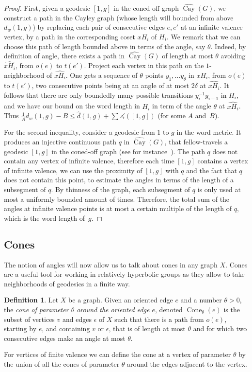 \documentclass[11pt]{article}
\theoremstyle{definition}
\newtheorem{defi}[theo]{Definition}
\numberwithin{equation}{section}
\DeclareMathOperator{\Co}{Cone}
\DeclareMathOperator{\Cay}{Cay}
\newcommand{\A}{\measuredangle}
\begin{document}
\begin{proof}
First, given a geodesic $[1,g]$ in the coned-off graph $\widehat{{\Cay}} (G)$, we construct a path in the Cayley graph (whose length will bounded from above $d_w(1,g)$) by replacing each pair of consecutive edges $e,e'$ at an infinite valence vertex, by a path in the corresponding coset $xH_i$ of $H_i$. We remark that we can choose this path of length bounded above in terms of the angle, say $\theta$. Indeed, by definition of angle, there exists a path in $\widehat{{\Cay}} (G)$ of length at most $\theta$ avoiding $\widehat{xH_i}$, from $o(e)$ to $t(e')$. Project each vertex in this path on the $1$-neighborhood of $\widehat{xH_i}$. One gets a sequence of $\theta$ points $y_1, \dots y_\theta$ in $xH_i$, from $o(e)$ to $t(e')$, two consecutive points being at an angle of at most $2\delta$ at $\widehat{xH_i}$. It follows that there are only boundedly many possible transitions $y_i^{-1}y_{i+1}$ in $H_i$, and we have our bound on the word length in $H_i$ in term of the angle $\theta$ at $\widehat{xH_i}$. Thus $ \frac1A d_w(1,g) -B \leq \hat{d}(1,g) + \sum\A ([1,g]) $ (for some $A$ and~$B$).

For the second inequality, consider a geodesic from $1$ to $g$ in the word metric. It produces an injective continuous path $q$ in $\widehat{{\Cay}} (G)$, that fellow-travels a geodesic $[1,g]$ in the coned-off graph (see for instance~\cite[Prop.~8.25]{DS}). The path $q$ does not contain any vertex of infinite valence, therefore each time $[1,g]$ contains a vertex of infinite valence, we can use the proximity of $[1,g]$ with $q$ and the fact that $q$ does not contain this point, to estimate the angles in terms of the length of a subsegment of $q$. By thinness of the graph, each subsegment of $q$ is only used at most a uniformly bounded amount of times. Therefore, the total sum of the angles at infinite valence points is at most a certain multiple of the length of $q$, which is the word length of~$g$.
\end{proof}

\subsection{Cones}
The notion of angles will now allow us to talk about cones in any graph $X$. Cones are a useful tool for working in relatively hyperbolic groups as they allow to take neighborhoods of geodesics in a finite way.

\begin{defi}
Let $X$ be a graph. Given an oriented edge $e$ and a number $\theta>0$, the \emph{cone of parameter $\theta$ around the oriented edge $e$}, denoted $\Co_{\theta}(e)$ is the subset of vertices $v$ and edges $\epsilon$ of $X$ such that there is a path from $o(e)$, starting by $e$, and containing $v$ or $\epsilon$, that is of length at most $\theta$ and for which two consecutive edges make an angle at most $\theta$.

For vertices of finite valence we can define the cone at a vertex of parameter $\theta$ by the union of all the cones of parameter $\theta$ around the edges adjacent to the vertex.
\end{defi}
\end{document}

